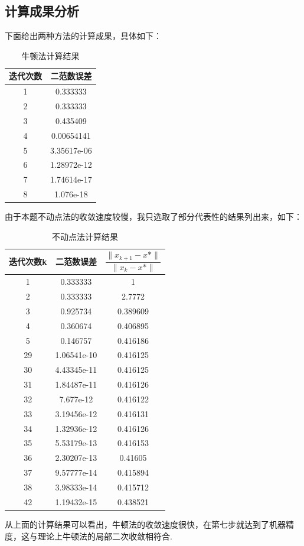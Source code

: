\documentclass{ctexart}
\begin{document}
\subsection{计算成果分析}
下面给出两种方法的计算成果，具体如下：
\begin{center}
    \begin{longtable}{|c|c|}
        \caption{牛顿法计算结果}\\
        \hline
        迭代次数& 二范数误差\\ 
        \hline
        1& 0.333333\\
        \hline
        2& 0.333333\\
        \hline
        3& 0.435409\\
        \hline
        4& 0.00654141\\
        \hline
        5& 3.35617e-06\\
        \hline
        6& 1.28972e-12\\
        \hline
        7& 1.74614e-17\\
        \hline
        8& 1.076e-18\\
        \hline
    \end{longtable}
\end{center}
由于本题不动点法的收敛速度较慢，我只选取了部分代表性的结果列出来，如下：
\begin{center}
    \begin{longtable}{|c|c|c|}
        \caption{不动点法计算结果}\\
        \hline
        迭代次数k& 二范数误差& $\dfrac{\|x_{k+1}-x*\|}{\|x_k-x*\|}$ \\
        \hline
        1& 0.333333& 1\\
        \hline
        2& 0.333333& 2.7772\\
        \hline
        3& 0.925734& 0.389609\\
        \hline
        4& 0.360674& 0.406895\\
        \hline
        5& 0.146757& 0.416186\\
        \hline
        29& 1.06541e-10& 0.416125\\
        \hline
        30& 4.43345e-11& 0.416125\\
        \hline
        31& 1.84487e-11& 0.416126\\
        \hline
        32& 7.677e-12& 0.416122\\
        \hline
        33& 3.19456e-12& 0.416131\\
        \hline
        34& 1.32936e-12& 0.416126\\
        \hline
        35& 5.53179e-13& 0.416153\\
        \hline
        36& 2.30207e-13& 0.41605\\
        \hline
        37& 9.57777e-14& 0.415894\\
        \hline
        38& 3.98333e-14& 0.415712\\
        \hline
        42& 1.19432e-15& 0.438521\\
        \hline
    \end{longtable}
\end{center}
从上面的计算结果可以看出，牛顿法的收敛速度很快，在第七步就达到了机器精度，这与理论上牛顿法的局部二次收敛相符合.
\end{document}
